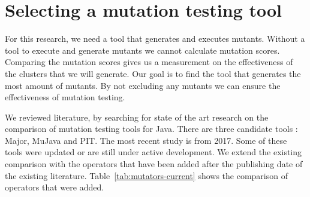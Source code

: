 \documentclass[conference,draftclsnofoot,onecolumn]{IEEEtran}
\begin{document}
\section{Selecting a mutation testing tool}
For this research, we need a tool that generates and executes mutants.
Without a tool to execute and generate mutants we cannot calculate mutation scores. 
Comparing the mutation scores gives us a measurement on the effectiveness of the clusters that we will generate.
Our goal is to find the tool that generates the most amount of mutants.
By not excluding any mutants we can ensure the effectiveness of mutation testing.

We reviewed literature, by searching for state of the art research on the comparison of mutation testing tools for Java\cite{thesis}.
There are three candidate tools \cite{Kintis2016AnalysingStudy,Marki2017MutationJava}: Major\cite{Major}, MuJava\cite{mujava} and PIT\cite{pit}.
The most recent study is from 2017. 
Some of these tools were updated or are still under active development\cite{pit-releases,Major}.
We extend the existing comparison with the operators that have been added after the publishing date of the existing literature.
Table~\ref{tab:mutators-current} shows the comparison of operators that were added.
\end{document}
